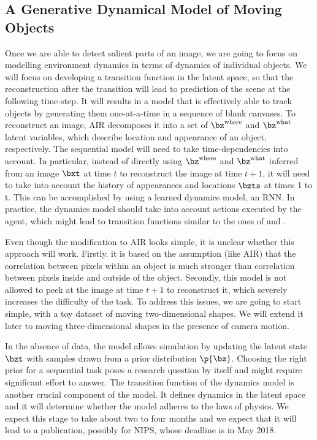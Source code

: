     \subsection{A Generative Dynamical Model of Moving Objects}
        Once we are able to detect salient parts of an image, we are going to focus on modelling environment dynamics in terms of dynamics of individual objects.
        We will focus on developing a transition function in the latent space, so that the reconstruction after the transition will lead to prediction of the scene at the following time-step.
        It will results in a model that is effectively able to track objects by generating them one-at-a-time in a sequence of blank canvases.
        To reconstruct an image, AIR decomposes it into a set of $\bz^{\mathrm{where}}$ and $\bz^{\mathrm{what}}$ latent variables, which describe location and appearance of an object, respectively.
        The sequential model will need to take time-dependencies into account.
        In particular, instead of directly using $\bz^{\mathrm{where}}$ and $\bz^{\mathrm{what}}$ inferred from an image $\bxt$ at time $t$ to reconstruct the image at time $t+1$, it will need to take into account the history of appearances and locations $\bzts$ at times 1 to t.
        This can be accomplished by using a learned dynamics model, \eg an RNN. 
        In practice, the dynamics model should take into account actions executed by the agent, which might lead to transition functions similar to the ones of \cite{Watter2015} and \cite{Karl2017}.
                
        Even though the modification to AIR looks simple, it is unclear whether this approach will work. Firstly. it is based on the assumption (like AIR) that the correlation between pixels within an object is much stronger than correlation between pixels inside and outside of the object. Secondly, this model is not allowed to peek at the image at time $t+1$ to reconstruct it, which severely increases the difficulty of the task. To address this issues, we are going to start simple, with a toy dataset of moving two-dimensional shapes. We will extend it later to moving three-dimensional shapes in the presence of camera motion.
        
        In the absence of data, the model allows simulation by updating the latent state $\bzt$ with samples drawn from a prior distribution $\p{\bz}$.
        Choosing the right prior for a sequential task poses a research question by itself \citep{Soelch2016} and might require significant effort to answer.
        The transition function of the dynamics model is another crucial component of the model. It defines dynamics in the latent space and it will determine whether the model adheres to the laws of physics.
        We expect this stage to take about two to four months and we expect that it will lead to a publication, possibly for NIPS, whose deadline is in May 2018.
       
